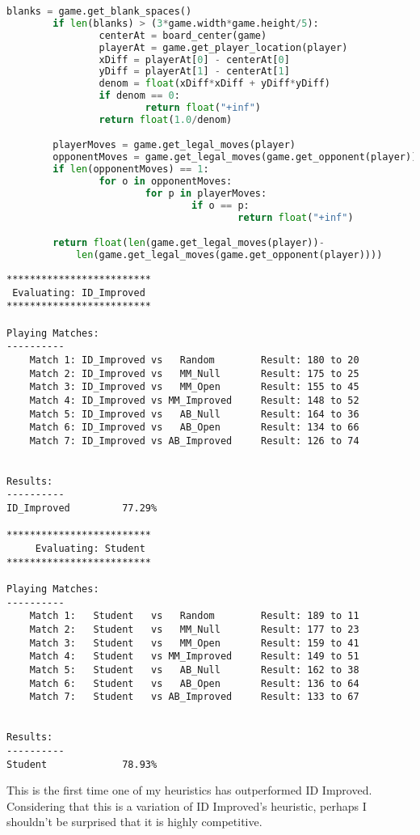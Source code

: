 \documentclass[10pt, a4paper]{article}
\begin{document}
\begin{lstlisting}[language=Python]
		blanks = game.get_blank_spaces()
		if len(blanks) > (3*game.width*game.height/5):
				centerAt = board_center(game)
				playerAt = game.get_player_location(player)
				xDiff = playerAt[0] - centerAt[0]
				yDiff = playerAt[1] - centerAt[1]
				denom = float(xDiff*xDiff + yDiff*yDiff)
				if denom == 0:
						return float("+inf")
				return float(1.0/denom)

		playerMoves = game.get_legal_moves(player)
		opponentMoves = game.get_legal_moves(game.get_opponent(player))
		if len(opponentMoves) == 1:
				for o in opponentMoves:
						for p in playerMoves:
								if o == p:
										return float("+inf")

		return float(len(game.get_legal_moves(player))-
			len(game.get_legal_moves(game.get_opponent(player))))
\end{lstlisting}

\begin{verbatim}
*************************
 Evaluating: ID_Improved 
*************************

Playing Matches:
----------
	Match 1: ID_Improved vs   Random    	Result: 180 to 20
	Match 2: ID_Improved vs   MM_Null   	Result: 175 to 25
	Match 3: ID_Improved vs   MM_Open   	Result: 155 to 45
	Match 4: ID_Improved vs MM_Improved 	Result: 148 to 52
	Match 5: ID_Improved vs   AB_Null   	Result: 164 to 36
	Match 6: ID_Improved vs   AB_Open   	Result: 134 to 66
	Match 7: ID_Improved vs AB_Improved 	Result: 126 to 74


Results:
----------
ID_Improved         77.29%

*************************
	 Evaluating: Student   
*************************

Playing Matches:
----------
	Match 1:   Student   vs   Random    	Result: 189 to 11
	Match 2:   Student   vs   MM_Null   	Result: 177 to 23
	Match 3:   Student   vs   MM_Open   	Result: 159 to 41
	Match 4:   Student   vs MM_Improved 	Result: 149 to 51
	Match 5:   Student   vs   AB_Null   	Result: 162 to 38
	Match 6:   Student   vs   AB_Open   	Result: 136 to 64
	Match 7:   Student   vs AB_Improved 	Result: 133 to 67


Results:
----------
Student             78.93%
\end{verbatim}

This is the first time one of my heuristics has outperformed ID Improved.  Considering that this
is a variation of ID Improved's heuristic, perhaps I shouldn't be surprised that it is highly competitive.
\end{document}
